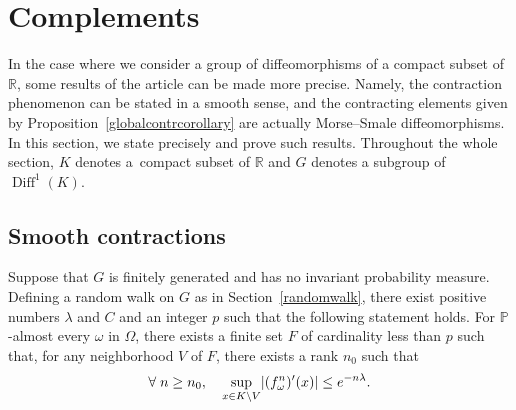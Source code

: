 \documentclass[AHL,Unicode,longabstracts,published]{cedram}
\DeclareMathOperator{\Diff}{Diff}
\newcommand{\bbP}{\mathbb{P}}
\newcommand{\R}{\mathbb{R}}
\newcounter{setofcase}
\newcounter{case}[setofcase]
\let\originalleft\left
\let\originalright\right
\renewcommand{\left}{\mathopen{}\mathclose\bgroup\originalleft}
\renewcommand{\right}{\aftergroup\egroup\originalright}
\let\oldforall\forall
\renewcommand*{\forall}{\mathrel{\oldforall}}
\newcommand{\R}{\mathbb{R}}
\begin{document}
\section{Complements}

In the case where we consider a group of diffeomorphisms of a compact subset of~$\R$, some results of the article can be made more precise. Namely, the contraction phenomenon can be stated in a smooth sense, and the contracting elements given by Proposition~\ref{globalcontrcorollary} are actually Morse--Smale diffeomorphisms. In this section, we state precisely and prove such results. Throughout the whole section, $K$ denotes a~compact subset of $\R$ and $G$ denotes a subgroup of $\Diff^1(K)$.


\subsection{Smooth contractions}

\begin{prop}\label{globalcontrdiffeo}
Suppose that $G$ is finitely generated and has no invariant probability measure. Defining a random walk on $G$ as in Section~\ref{randomwalk}, there exist positive numbers $\lambda$ and $C$ and an integer $p$ such that the following statement holds. For $\bbP$-almost every $\omega$ in $\Omega$, there exists a finite set $F$ of cardinality less than $p$ such that, for any neighborhood $V$ of $F$, there exists a rank $n_0$ such that
\[
\forall n\geq n_0,\quad \sup_{x\in K\backslash V} \left|(f_\omega^n)'(x)\right|\leq e^{-n\lambda}.
\]
\end{prop}
\end{document}
